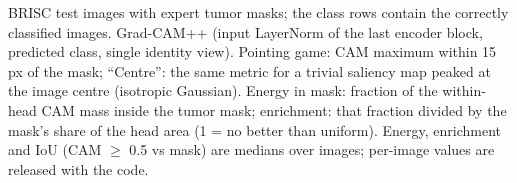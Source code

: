 BRISC test images with expert tumor masks; the class rows contain the correctly classified images. Grad-CAM++ (input LayerNorm of the last encoder block, predicted class, single identity view). Pointing game: CAM maximum within 15\,px of the mask; ``Centre'': the same metric for a trivial saliency map peaked at the image centre (isotropic Gaussian). Energy in mask: fraction of the within-head CAM mass inside the tumor mask; enrichment: that fraction divided by the mask's share of the head area (1 = no better than uniform). Energy, enrichment and IoU (CAM $\ge$ 0.5 vs mask) are medians over images; per-image values are released with the code.
